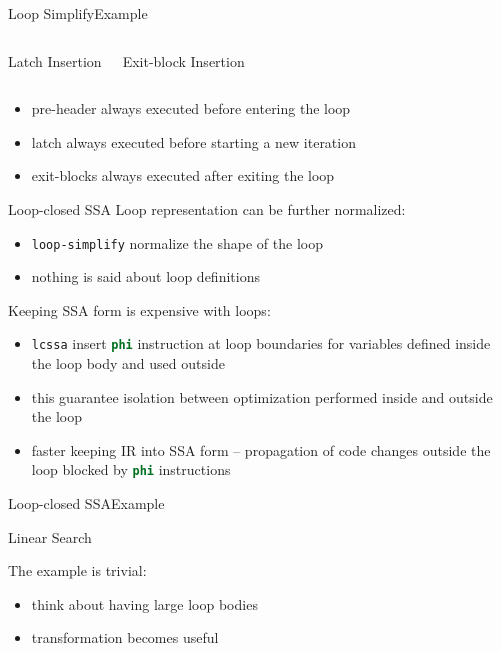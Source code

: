 \documentclass[10pt,mathserif]{beamer}
\newcommand{\cinput}[1]{}
\newcommand{\llvminline}[1]{\lstinline[language=LLVM]!#1!}
\begin{document}
\begin{frame}{Loop Simplify}{Example}
\begin{columns}[t]
\begin{block}{Latch Insertion}
\centering

\end{block}

\begin{block}{Exit-block Insertion}
\centering

\end{block}
\end{columns}

\begin{itemize}
\item pre-header always executed before entering the loop
\item latch always executed before starting a new iteration
\item exit-blocks always executed after exiting the loop
\end{itemize}
\end{frame}

\begin{frame}{Loop-closed SSA}
Loop representation can be further normalized:

\begin{itemize}
\item \texttt{loop-simplify} normalize the \alert{shape} of the loop
\item nothing is said about loop definitions
\end{itemize}

Keeping SSA form is expensive with loops:

\begin{itemize}
\item \texttt{lcssa} insert \llvminline{phi} instruction at loop boundaries for
      variables \alert{defined inside} the loop body and \alert{used outside}
\item this guarantee isolation between optimization performed inside and outside
      the loop
\item faster keeping IR into SSA form -- propagation of code changes outside the
      loop blocked by \llvminline{phi} instructions
\end{itemize}
\end{frame}

\begin{frame}{Loop-closed SSA}{Example}
\begin{block}{Linear Search}
\centering
\cinput{snippet/02/lcssa.c}
\end{block}

The example is trivial:

\begin{itemize}
\item think about having large loop bodies
\item transformation becomes useful
\end{itemize}
\end{frame}
\end{document}
